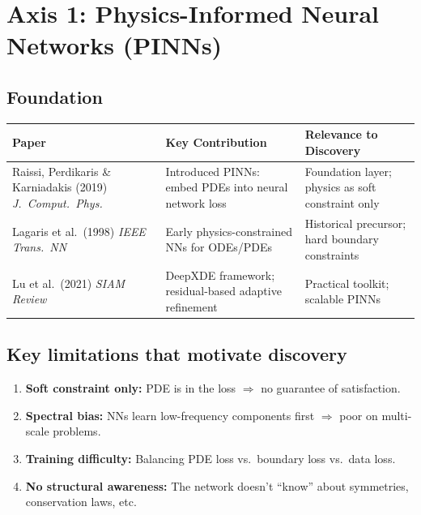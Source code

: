 \documentclass[11pt,a4paper]{article}
\begin{document}
\section{Axis 1: Physics-Informed Neural Networks (PINNs)}

\subsection{Foundation}

\begin{center}
\renewcommand{\arraystretch}{1.3}
\begin{tabular}{@{}p{3.5cm} p{4cm} p{5.5cm}@{}}
\toprule
\textbf{Paper} & \textbf{Key Contribution} & \textbf{Relevance to Discovery} \\
\midrule
Raissi, Perdikaris \& Karniadakis (2019) \textit{J.\ Comput.\ Phys.} & Introduced PINNs: embed PDEs into neural network loss & Foundation layer; physics as soft constraint only \\
\addlinespace
Lagaris et al.\ (1998) \textit{IEEE Trans.\ NN} & Early physics-constrained NNs for ODEs/PDEs & Historical precursor; hard boundary constraints \\
\addlinespace
Lu et al.\ (2021) \textit{SIAM Review} & DeepXDE framework; residual-based adaptive refinement & Practical toolkit; scalable PINNs \\
\bottomrule
\end{tabular}
\end{center}

\subsection{Key limitations that motivate discovery}

\begin{enumerate}[leftmargin=1.8em,itemsep=2pt]
\item \textbf{Soft constraint only:} PDE is in the loss $\Rightarrow$ no guarantee of satisfaction.
\item \textbf{Spectral bias:} NNs learn low-frequency components first $\Rightarrow$ poor on multi-scale problems.
\item \textbf{Training difficulty:} Balancing PDE loss vs.\ boundary loss vs.\ data loss.
\item \textbf{No structural awareness:} The network doesn't ``know'' about symmetries, conservation laws, etc.
\end{enumerate}
\end{document}
